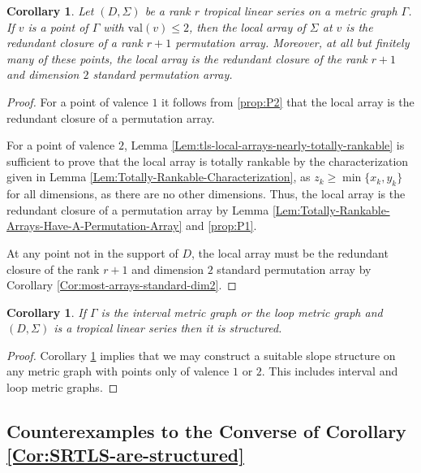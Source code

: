 \documentclass{amsart}
\newtheorem{corollary}[theorem]{Corollary}
\begin{document}
	\begin{corollary}
		\label{Cor:tls-structured-at-small-dimension-points}
		Let $(D, \Sigma)$ be a rank $r$ tropical linear series on a metric graph $\Gamma$. If $v$ is a point of $\Gamma$ with $\mathrm{val}(v) \leq 2$, then the local array of $\Sigma$ at $v$ is the redundant closure of a rank $r+1$ permutation array. Moreover, at all but finitely many of these points, the local array is the redundant closure of the rank $r+1$ and dimension $2$ standard permutation array.
	\end{corollary}
	
	\begin{proof}
		For a point of valence $1$ it follows from \ref{prop:P2} that the local array is the redundant closure of a permutation array. 
		
		For a point of valence $2$, Lemma \ref{Lem:tls-local-arrays-nearly-totally-rankable} is sufficient to prove that the local array is totally rankable by the characterization given in Lemma \ref{Lem:Totally-Rankable-Characterization}, as $z_k \geq \min \{ x_k,y_k \}$ for all dimensions, as there are no other dimensions. Thus, the local array is the redundant closure of a permutation array by Lemma \ref{Lem:Totally-Rankable-Arrays-Have-A-Permutation-Array} and \ref{prop:P1}.
		
		At any point not in the support of $D$, the local array must be the redundant closure of the rank $r+1$ and dimension $2$ standard permutation array by Corollary \ref{Cor:most-arrays-standard-dim2}.
	\end{proof}
	
	\begin{corollary}
		\label{Cor:tls-structured-on-loop-and-interval}
		If $\Gamma$ is the interval metric graph or the loop metric graph and $(D, \Sigma)$ is a tropical linear series then it is structured.
	\end{corollary}
	
	\begin{proof}
		Corollary \ref{Cor:tls-structured-at-small-dimension-points} implies that we may construct a suitable slope structure on any metric graph with points only of valence $1$ or $2$. This includes interval and loop metric graphs.
	\end{proof}
	
	\subsection{Counterexamples to the Converse of Corollary \ref{Cor:SRTLS-are-structured}}
	\label{Subsec:not-all-structured-are-strongly-recursive}
	
\end{document}
